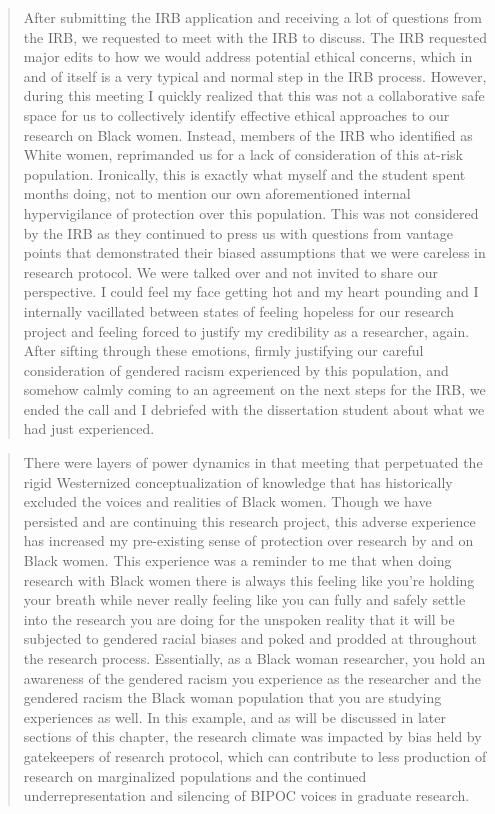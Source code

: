\documentclass[
  11pt,
]{book}
\begin{document}
\begin{quote}
After submitting the IRB application and receiving a lot of questions from the IRB, we requested to meet with the IRB to discuss. The IRB requested major edits to how we would address potential ethical concerns, which in and of itself is a very typical and normal step in the IRB process. However, during this meeting I quickly realized that this was not a collaborative safe space for us to collectively identify effective ethical approaches to our research on Black women. Instead, members of the IRB who identified as White women, reprimanded us for a lack of consideration of this at-risk population. Ironically, this is exactly what myself and the student spent months doing, not to mention our own aforementioned internal hypervigilance of protection over this population. This was not considered by the IRB as they continued to press us with questions from vantage points that demonstrated their biased assumptions that we were careless in research protocol. We were talked over and not invited to share our perspective. I could feel my face getting hot and my heart pounding and I internally vacillated between states of feeling hopeless for our research project and feeling forced to justify my credibility as a researcher, again. After sifting through these emotions, firmly justifying our careful consideration of gendered racism experienced by this population, and somehow calmly coming to an agreement on the next steps for the IRB, we ended the call and I debriefed with the dissertation student about what we had just experienced.
\end{quote}

\begin{quote}
There were layers of power dynamics in that meeting that perpetuated the rigid Westernized conceptualization of knowledge that has historically excluded the voices and realities of Black women. Though we have persisted and are continuing this research project, this adverse experience has increased my pre-existing sense of protection over research by and on Black women. This experience was a reminder to me that when doing research with Black women there is always this feeling like you're holding your breath while never really feeling like you can fully and safely settle into the research you are doing for the unspoken reality that it will be subjected to gendered racial biases and poked and prodded at throughout the research process. Essentially, as a Black woman researcher, you hold an awareness of the gendered racism you experience as the researcher and the gendered racism the Black woman population that you are studying experiences as well. In this example, and as will be discussed in later sections of this chapter, the research climate was impacted by bias held by gatekeepers of research protocol, which can contribute to less production of research on marginalized populations and the continued underrepresentation and silencing of BIPOC voices in graduate research.
\end{quote}
\end{document}
